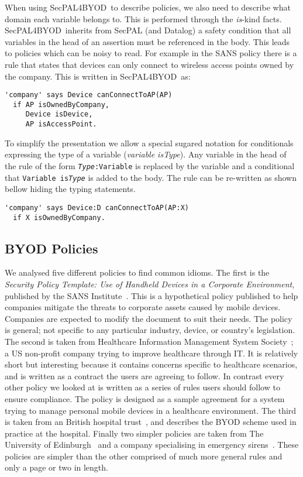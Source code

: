\documentclass{llncs}
\newcommand{\AppPAL}[0]{SecPAL4BYOD}
\begin{document}
When using \AppPAL~to describe policies, we also need to describe what domain each variable belongs to.
This is performed through the \emph{is}-kind facts.
\AppPAL~inherits from SecPAL (and Datalog) a safety condition that all variables in the head of an assertion must be referenced in the body.
This leads to policies which can be noisy to read.
For example in the SANS policy there is a rule that states that devices can only connect to wireless access points owned by the company.
This is written in \AppPAL~as:
\begin{lstlisting}
'company' says Device canConnectToAP(AP)
  if AP isOwnedByCompany,
     Device isDevice,
     AP isAccessPoint.
\end{lstlisting}
To simplify the presentation we allow a special sugared notation for conditionals expressing the type of a variable (\emph{variable \emph{is}Type}).
Any variable in the head of the rule of the form \texttt{\emph{Type}:Variable} is replaced by the variable and a conditional that \texttt{Variable is\emph{Type}} is added to the body.
The rule can be re-written as shown bellow hiding the typing statements.
\begin{lstlisting}
'company' says Device:D canConnectToAP(AP:X)
  if X isOwnedByCompany.
\end{lstlisting}

\subsection{BYOD Policies}

We analysed five different policies to find common idioms.
The first is the \emph{Security Policy Template: Use of Handheld Devices in a Corporate Environment}, published by the SANS Institute~\cite{nicholas_r._c._guerin_security_2008}.
This is a hypothetical policy published to help companies mitigate the threats to corporate assets caused by mobile devices.
Companies are expected to modify the document to suit their needs.
The policy is general; not specific to any particular industry, device, or country's legislation.
The second is taken from Healthcare Information Management System Society~\cite{healthcare_information_and_management_systems_society_mobile_2012};
  a US non-profit company trying to improve healthcare through IT.
It is relatively short but interesting because it contains concerns specific to healthcare scenarios, and is written as a contract the users are agreeing to follow.
In contrast every other policy we looked at is written as a series of rules users should follow to ensure compliance.
The policy is designed as a sample agreement for a system trying to manage personal mobile devices in a healthcare environment.
The third is taken from an British hospital trust~\cite{kennington_mobiles_2014}, and describes the BYOD scheme used in practice at the hospital.
Finally two simpler policies are taken from The University of Edinburgh~\cite{david_williamson_bring_2015} and a company specialising in emergency sirens~\cite{code3pse.org_sample_????}.
These policies are simpler than the other comprised of much more general rules and only a page or two in length.
\end{document}
